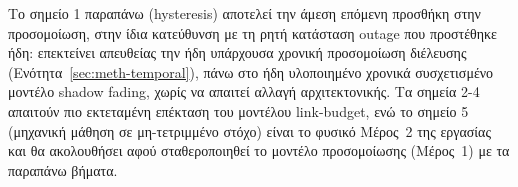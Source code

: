 Το σημείο 1 παραπάνω (hysteresis) αποτελεί την άμεση επόμενη προσθήκη
στην προσομοίωση, στην ίδια κατεύθυνση με τη ρητή κατάσταση outage που
προστέθηκε ήδη: επεκτείνει απευθείας την ήδη υπάρχουσα χρονική
προσομοίωση διέλευσης (Ενότητα~\ref{sec:meth-temporal}), πάνω στο ήδη
υλοποιημένο χρονικά συσχετισμένο μοντέλο shadow fading, χωρίς να απαιτεί
αλλαγή αρχιτεκτονικής. Τα σημεία 2-4 απαιτούν πιο εκτεταμένη επέκταση του
μοντέλου link-budget, ενώ το σημείο 5 (μηχανική μάθηση σε μη-τετριμμένο
στόχο) είναι το φυσικό Μέρος~2 της εργασίας και θα ακολουθήσει αφού
σταθεροποιηθεί το μοντέλο προσομοίωσης (Μέρος~1) με τα παραπάνω βήματα.
